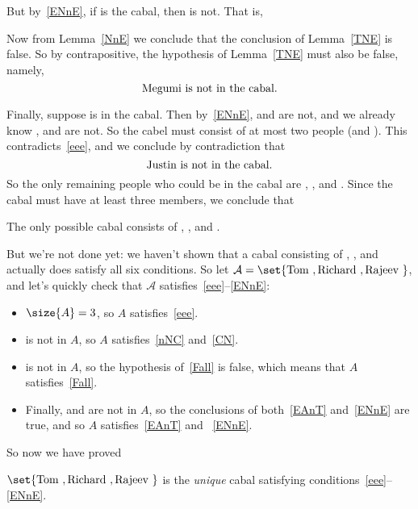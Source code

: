 \begin{problem}
{But by~\eqref{ENnE}, if \Nick is the cabal, then \Eric is not.  That is, 
\begin{lemma}\label{NnE}
\end{lemma}
Now from Lemma~\ref{NnE} we conclude that the conclusion of
Lemma~\ref{TNE} is false.  So by contrapositive, the hypothesis of
Lemma~\ref{TNE} must also be false, namely,
\begin{equation}\label{nT}
\text{\text{Megumi }is not in the cabal.}
\end{equation}

Finally, suppose \Eric is in the cabal.  Then by~\eqref{ENnE}, \Edmond
and \Nick are not, and we already know \Florent, \Claire and \Tom are not. So
the cabel must consist of at most two people (\Albert and \Eric). This
contradicts~\eqref{eee}, and we conclude by contradiction that
\begin{equation}\label{nE}
\text{\text{Justin }is not in the cabal.}
\end{equation}
So the only remaining people who could be in the cabal are \Albert, \Edmond,
and \Nick.  Since the cabal must have at least three members, we conclude
that
\begin{lemma}
The only possible cabal consists of \Albert, \Edmond, and \Nick.
\end{lemma}

But we're not done yet: we haven't shown that a cabal consisting of
\Albert, \Edmond, and \Nick actually does satisfy all six conditions.  So let
$\mathcal{A} =\set{\text{\Albert}, \text{\Edmond}, \text{\Nick}}$, and let's quickly
check that $\mathcal{A}$ satisfies~\eqref{eee}--\eqref{ENnE}:

\begin{itemize}

\item $\size{A} = 3$, so $A$ satisfies~\eqref{eee}.
\item \Claire is not in $A$, so $A$ satisfies~\eqref{nNC} and~\eqref{CN}.
\item \Florent is not in $A$, so the hypothesis of~\eqref{Fall} is false, which
means that $A$ satisfies~\eqref{Fall}.
\item Finally, \Tom and \Eric are not in $A$, so the conclusions of
both~\eqref{EAnT} and~\eqref{ENnE} are true, and so $A$
satisfies~\eqref{EAnT} and ~\eqref{ENnE}.

\end{itemize}

So now we have proved
\begin{proposition*}
$\set{\text{\Albert}, \text{\Edmond}, \text{\Nick}}$ is the \emph{unique} cabal
satisfying conditions~\eqref{eee}--\eqref{ENnE}.
\end{proposition*}}
\end{problem}


